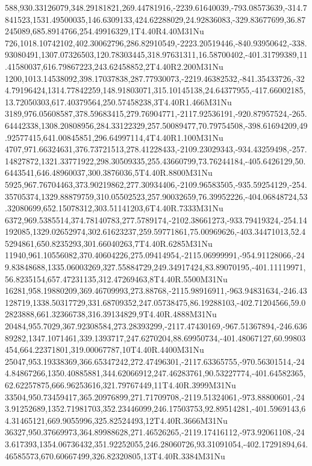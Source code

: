 588,930.33126079,348.29181821,269.44781916,-2239.61640039,-793.08573639,-314.7841523,1531.49500035,146.6309133,424.62288029,24.92836083,-329.83677699,36.87245089,685.8914766,254.49916329,1T4.40R4.40M31Nu
726,1018.10742102,402.30062796,286.82910549,-2223.20519446,-840.93950642,-338.93080491,1307.07326503,120.78303445,318.97631311,16.58700402,-401.31799389,11.41580037,616.79867223,243.62458852,2T4.40R2.200M31Nu
1200,1013.14538092,398.17037838,287.77930073,-2219.46382532,-841.35433726,-324.79196424,1314.77842259,148.91803071,315.10145138,24.64377955,-417.66002185,13.72050303,617.40379564,250.57458238,3T4.40R1.466M31Nu
3189,976.05608587,378.59683415,279.76904771,-2117.92536191,-920.87957524,-265.64442338,1308.20808956,284.33122329,257.50089477,70.79754508,-398.61694209,49.92577415,641.00845851,296.64997114,4T4.40R1.100M31Nu
4707,971.66324631,376.73721513,278.41228433,-2109.23029343,-934.43259498,-257.14827872,1321.33771922,298.30509335,255.43660799,73.76244184,-405.6426129,50.6443541,646.48960037,300.3876036,5T4.40R.8800M31Nu
5925,967.76704463,373.90219862,277.30934406,-2109.96583505,-935.59254129,-254.35705374,1329.88879759,310.05502523,257.90032659,76.39952226,-404.06848724,53.32080699,652.15078312,303.51141203,6T4.40R.7333M31Nu
6372,969.5385514,374.78140783,277.5789174,-2102.38661273,-933.79419324,-254.14192085,1329.02652974,302.61623237,259.59771861,75.00969626,-403.34471013,52.45294861,650.8235293,301.66040263,7T4.40R.6285M31Nu
11940,961.10556082,370.40604226,275.09414954,-2115.06999991,-954.91128066,-249.83848688,1335.06003269,327.55884729,249.34917424,83.89070195,-401.11119971,56.8235154,657.47231135,312.47269463,8T4.40R.5500M31Nu
16281,958.19880209,369.46709993,273.88768,-2115.98916911,-963.94831634,-246.43128719,1338.50317729,331.68709352,247.05738475,86.19288103,-402.71204566,59.02823888,661.32366738,316.39134829,9T4.40R.4888M31Nu
20484,955.7029,367.92308584,273.28393299,-2117.47430169,-967.51367894,-246.63689282,1347.1071461,339.1393717,247.6270204,88.69950734,-401.48067127,60.99803454,664.22371801,319.00067787,10T4.40R.4400M31Nu
25047,953.19338369,366.65347242,272.47496301,-2117.63365755,-970.56301514,-244.84867266,1350.40885881,344.62066912,247.46283761,90.53227774,-401.64582365,62.62257875,666.96253616,321.79767449,11T4.40R.3999M31Nu
33504,950.73459417,365.20976899,271.71709708,-2119.51324061,-973.88800601,-243.91252689,1352.71981703,352.23446099,246.17503753,92.89514281,-401.5969143,64.31465121,669.9055996,325.82524493,12T4.40R.3666M31Nu
36327,950.37669973,364.89988628,271.46526265,-2119.17416112,-973.92061108,-243.617393,1354.06736432,351.92252055,246.28060726,93.31091054,-402.17291894,64.46585573,670.60667499,326.82320805,13T4.40R.3384M31Nu
